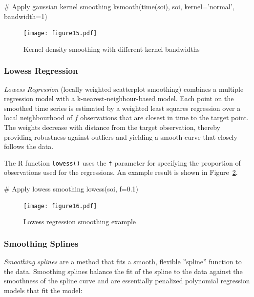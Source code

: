 \begin{Rcode}
# Apply gaussian kernel smoothing
ksmooth(time(soi), soi, kernel='normal', bandwidth=1)
\end{Rcode}

\begin{figure}
\centering
\texttt{[image: figure15.pdf]}
\caption{Kernel density smoothing with different kernel bandwidths}
\label{fig:figure15}
\end{figure}

\subsubsection*{Lowess Regression}

\emph{Lowess Regression} (locally weighted scatterplot smoothing) combines a multiple regression model with a k-nearest-neighbour-based model. Each point on the smoothed time series is estimated by a weighted least squares regression over a local neighbourhood of $f$ observations that are closest in time to the target point. The weights decrease with distance from the target observation, thereby providing robustness against outliers and yielding a smooth curve that closely follows the data. 

The R function \texttt{lowess()} uses the \texttt{f} parameter for specifying the proportion of observations used for the regressions. An example result is shown in Figure~\ref{fig:figure16}.

\begin{Rcode}
# Apply lowess smoothing
lowess(soi, f=0.1)
\end{Rcode}

\begin{figure}
\centering
\texttt{[image: figure16.pdf]}
\caption{Lowess regression smoothing example}
\label{fig:figure16}
\end{figure}

\subsubsection*{Smoothing Splines}

\emph{Smoothing splines} are a method that fits a smooth, flexible ''spline'' function to the data. Smoothing splines balance the fit of the spline to the data against the smoothness of the spline curve and are essentially penalized polynomial regression models that fit the model:

